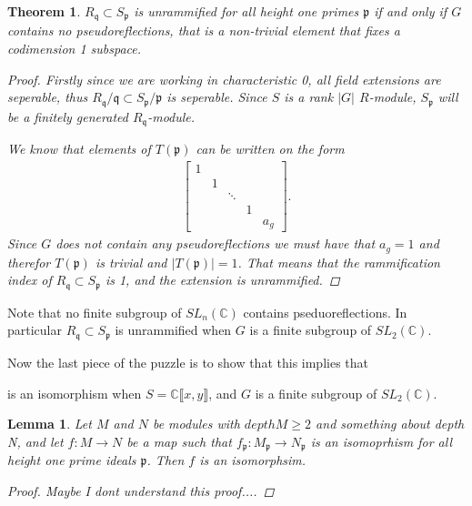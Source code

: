 \documentclass[11pt, a4paper, english]{article}
\numberwithin{prop}{section}
\newtheorem{lemma}{Lemma}
\numberwithin{lemma}{section}
\newtheorem{theorem}{Theorem}
\numberwithin{theorem}{section}
\numberwithin{defin}{section}
\numberwithin{example}{section}
\newcommand{\C}{\mathbb{C}}
\DeclareMathOperator{\End}{End}
\begin{document}
\begin{theorem}
\label{thm:unrammified_pseudoreflections}
$R_\mathfrak{q} \subset S_\mathfrak{p}$ is unrammified for all height one primes $\mathfrak{p}$ if and only if $G$ contains no pseudoreflections, that is a non-trivial element that fixes a codimension 1 subspace.
\begin{proof}
Firstly since we are working in characteristic 0, all field extensions are seperable, thus $R_\mathfrak{q}/\mathfrak{q} \subset S_\mathfrak{p}/\mathfrak{p}$ is seperable. Since $S$ is a rank $|G|$ $R$-module, $S_\mathfrak{p}$ will be a finitely generated $R_\mathfrak{q}$-module.

We know that elements of $T(\mathfrak{p})$ can be written on the form
\begin{align*}
\begin{bmatrix}
1\\
& 1\\
&& \ddots\\
&&&1\\
&&&& a_g
\end{bmatrix}.
\end{align*}
Since $G$ does not contain any pseudoreflections we must have that $a_g = 1$ and therefor $T(\mathfrak{p})$ is trivial and $|T(\mathfrak{p})| = 1$. That means that the rammification index of $R_\mathfrak{q} \subset S_\mathfrak{p}$ is 1, and the extension is unrammified.
\end{proof}
\end{theorem}
Note that no finite subgroup of $SL_n(\C)$ contains pseduoreflections. In particular $R_\mathfrak{q} \subset S_\mathfrak{p}$ is unrammified when $G$ is a finite subgroup of $SL_2(\C)$.

Now the last piece of the puzzle is to show that this implies that 
\begin{center}
\end{center}
is an isomorphism when $S = \C\llbracket x, y \rrbracket$, and $G$ is a finite subgroup of $SL_2(\C)$.

\begin{lemma}
\label{lem:height_one_iso}
Let $M$ and $N$ be modules with $depth M \geq 2$ and {\color{red}something about depth N}, and let $f: M \to N$ be a map such that $f_\mathfrak{p}: M_\mathfrak{p} \to N_\mathfrak{p}$ is an isomoprhism for all height one prime ideals $\mathfrak{p}$. Then $f$ is an isomorphsim.
\begin{proof}
{\color{red} Maybe I dont understand this proof....}
\end{proof}
\end{lemma}
\end{document}
